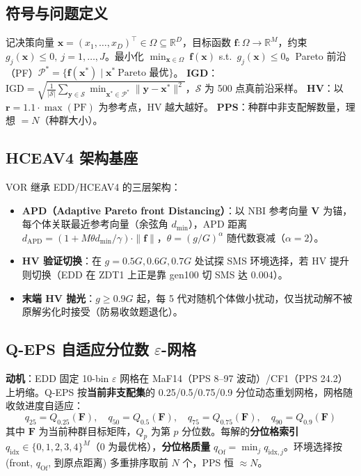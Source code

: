 \documentclass[a4paper,11pt]{article}
\begin{document}
\subsection{符号与问题定义}
记决策向量 $\mathbf{x}=(x_1,\dots,x_D)^\top\in\Omega\subseteq\mathbb{R}^D$，目标函数 $\mathbf{f}:\Omega\to\mathbb{R}^M$，约束 $g_j(\mathbf{x})\leq0,\ j=1,\dots,J$。最小化 $\min_{\mathbf{x}\in\Omega}\ \mathbf{f}(\mathbf{x})$ s.t.\ $g_j(\mathbf{x})\leq0$。Pareto 前沿（PF）$\mathcal{P}^*=\{\mathbf{f}(\mathbf{x}^*)\mid \mathbf{x}^*\ \text{Pareto 最优}\}$。
\textbf{IGD}：$\text{IGD}=\sqrt{\frac{1}{|\mathcal{S}|}\sum_{\mathbf{y}\in\mathcal{S}}\min_{\mathbf{x}^*\in\mathcal{P}^*}\|\mathbf{y}-\mathbf{x}^*\|^2}$，$\mathcal{S}$ 为 500 点真前沿采样。
\textbf{HV}：以 $\mathbf{r}=1.1\cdot\max(\text{PF})$ 为参考点，HV 越大越好。
\textbf{PPS}：种群中非支配解数量，理想 $=N$（种群大小）。

\subsection{HCEAV4 架构基座}
VOR 继承 EDD/HCEAV4 的三层架构：
\begin{itemize}
\item \textbf{APD（Adaptive Pareto front Distancing）}：以 NBI 参考向量 $\mathbf{V}$ 为锚，每个体关联最近参考向量（余弦角 $d_{\min}$），APD 距离 $d_{\text{APD}}=(1+M\theta d_{\min}/\gamma)\cdot\|\mathbf{f}\|$，$\theta=(g/G)^{\alpha}$ 随代数衰减（$\alpha=2$）。
\item \textbf{HV 验证切换}：在 $g=0.5G,0.6G,0.7G$ 处试探 SMS 环境选择，若 HV 提升则切换（EDD 在 ZDT1 上正是靠 gen100 切 SMS 达 0.004）。
\item \textbf{末端 HV 抛光}：$g\geq0.9G$ 起，每 5 代对随机个体做小扰动，仅当扰动解不被原解劣化时接受（防易收敛题退化）。
\end{itemize}

\subsection{Q-EPS 自适应分位数 $\varepsilon$-网格}
\label{sec:qeps}
\textbf{动机}：EDD 固定 10-bin $\varepsilon$ 网格在 MaF14（PPS 8--97 波动）/CF1（PPS 24.2）上坍缩。Q-EPS 按\textbf{当前非支配集}的 0.25/0.5/0.75/0.9 分位动态重划网格，网格随收敛进度自适应：
\begin{equation}
q_{25}=Q_{0.25}(\mathbf{F}),\quad q_{50}=Q_{0.5}(\mathbf{F}),\quad q_{75}=Q_{0.75}(\mathbf{F}),\quad q_{90}=Q_{0.9}(\mathbf{F})
\end{equation}
其中 $\mathbf{F}$ 为当前种群目标矩阵，$Q_p$ 为第 $p$ 分位数。每解的\textbf{分位格索引} $q_{\text{idx}}\in\{0,1,2,3,4\}^M$（0 为最优格），\textbf{分位格质量} $q_{\text{Of}}=\min_j q_{\text{idx},j}$。环境选择按 (front, $q_{\text{Of}}$, 到原点距离) 多重排序取前 $N$ 个，PPS 恒 $\approx N$。
\end{document}

